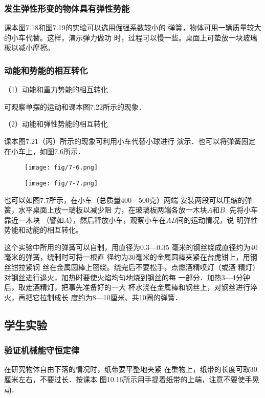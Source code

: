 \subsubsection{发生弹性形变的物体具有弹性势能}

课本图7.18和图7.19的实验可以选用倔强系数较小的
弹簧，物体可用一辆质量较大的小车代替。这样，演示弹力做功
时，过程可以慢一些。桌面上可垫放一块玻璃板以减小摩擦。


\subsubsection{动能和势能的相互转化}


（1）动能和重力势能的相互转化

可观察单摆的运动和课本图7.22所示的现象．

（2）动能和弹性势能的相互转化

课本图7.21（丙）所示的现象可利用小车代替小球进行
演示．也可以将弹簧固定在小车上，如图7.6所示．

\begin{figure}[htp]\centering
    \begin{minipage}[t]{0.48\textwidth}
    \centering
\texttt{[image: fig/7-6.png]}
    \caption{}
    \end{minipage}
    \begin{minipage}[t]{0.48\textwidth}
    \centering
\texttt{[image: fig/7-7.png]}
    \caption{}
    \end{minipage}
    \end{figure}

也可以如图7.7所示，在小车（总质量400—500克）两端
安装两段可以压缩的弹簧，水平桌面上放一璃板以减少阻
力，在玻璃板两端各放一木块$A$和$B$. 先将小车靠近一木块
（譬如$A$），然后释放小车，观察小车在$AB$间的运动情况，说
明弹性势能和动能的相互转化。

这个实验中所用的弹簧可以自制，用直径为0.3—0.35
毫米的钢丝绕成直径约为40毫米的弹簧，绕制时可将一根直
径约为30毫米的金属圆棒夹紧在台虎钳上，用钢丝钳拉紧钢
丝在金属圆棒上密绕。绕完后不要松手，点燃酒精喷灯（或酒
精灯）对钢丝进行退火，加热时要使火焰均匀地烧到钢丝的每
一部分．加热3—4分钟后，取走酒精灯，把事先准备好的一大
杯水浇在金属棒和钢丝上，对钢丝进行淬火，再把它拉制成长
度约为8—10厘米、共10圈的弹簧．

\subsection{学生实验}
\subsubsection{验证机械能守恒定律}
在研究物体自由下落的情况时，纸带要平整地夹紧
在重物上，纸带的长度可取30厘米左右，不要过长．按课本
图10.16所示用手提着纸带的上端，注意不要使手晃动．

